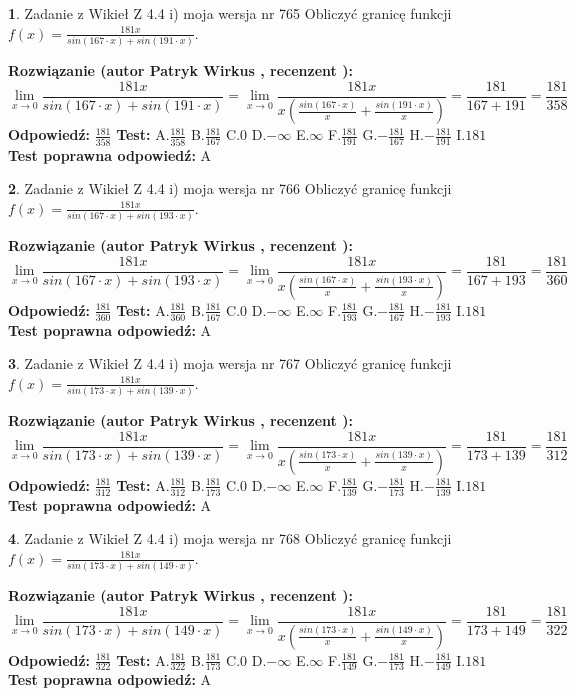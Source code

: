 \documentclass[12pt, a4paper]{article}
\theoremstyle{definition} %
\newtheorem{zad}{}
\newcommand{\zadStart}[1]{\begin{zad}#1\newline}
\newcommand{\zadStop}{\end{zad}}
\newcommand{\rozwStart}[2]{\noindent \textbf{Rozwiązanie (autor #1 , recenzent #2): }\newline}
\newcommand{\rozwStop}{\newline}
\newcommand{\odpStart}{\noindent \textbf{Odpowiedź:}\newline}
\newcommand{\odpStop}{\newline}
\newcommand{\testStart}{\noindent \textbf{Test:}\newline}
\newcommand{\testStop}{\newline}
\newcommand{\kluczStart}{\noindent \textbf{Test poprawna odpowiedź:}\newline}
\newcommand{\kluczStop}{\newline}
\begin{document}
\zadStart{Zadanie z Wikieł Z 4.4 i) moja wersja nr 765}
Obliczyć granicę funkcji $f(x)=\frac{181x}{sin(167\cdot x) +sin(191\cdot x)}$.
\zadStop
\rozwStart{Patryk Wirkus}{}
$$\lim\limits_{x\to 0}\frac{181x}{sin(167\cdot x) +sin(191\cdot x)}=\lim\limits_{x\to 0}\frac{181x}{x(\frac{sin(167\cdot x)}{x}+\frac{sin(191\cdot x)}{x})}=\frac{181}{167+191} = \frac{181}{358}$$
\rozwStop
\odpStart
$\frac{181}{358}$
\odpStop
\testStart
A.$\frac{181}{358}$
B.$\frac{181}{167}$
C.$0$
D.$-\infty$
E.$\infty$
F.$\frac{181}{191}$
G.$-\frac{181}{167}$
H.$-\frac{181}{191}$
I.$181$
\testStop
\kluczStart
A
\kluczStop



\zadStart{Zadanie z Wikieł Z 4.4 i) moja wersja nr 766}
Obliczyć granicę funkcji $f(x)=\frac{181x}{sin(167\cdot x) +sin(193\cdot x)}$.
\zadStop
\rozwStart{Patryk Wirkus}{}
$$\lim\limits_{x\to 0}\frac{181x}{sin(167\cdot x) +sin(193\cdot x)}=\lim\limits_{x\to 0}\frac{181x}{x(\frac{sin(167\cdot x)}{x}+\frac{sin(193\cdot x)}{x})}=\frac{181}{167+193} = \frac{181}{360}$$
\rozwStop
\odpStart
$\frac{181}{360}$
\odpStop
\testStart
A.$\frac{181}{360}$
B.$\frac{181}{167}$
C.$0$
D.$-\infty$
E.$\infty$
F.$\frac{181}{193}$
G.$-\frac{181}{167}$
H.$-\frac{181}{193}$
I.$181$
\testStop
\kluczStart
A
\kluczStop



\zadStart{Zadanie z Wikieł Z 4.4 i) moja wersja nr 767}
Obliczyć granicę funkcji $f(x)=\frac{181x}{sin(173\cdot x) +sin(139\cdot x)}$.
\zadStop
\rozwStart{Patryk Wirkus}{}
$$\lim\limits_{x\to 0}\frac{181x}{sin(173\cdot x) +sin(139\cdot x)}=\lim\limits_{x\to 0}\frac{181x}{x(\frac{sin(173\cdot x)}{x}+\frac{sin(139\cdot x)}{x})}=\frac{181}{173+139} = \frac{181}{312}$$
\rozwStop
\odpStart
$\frac{181}{312}$
\odpStop
\testStart
A.$\frac{181}{312}$
B.$\frac{181}{173}$
C.$0$
D.$-\infty$
E.$\infty$
F.$\frac{181}{139}$
G.$-\frac{181}{173}$
H.$-\frac{181}{139}$
I.$181$
\testStop
\kluczStart
A
\kluczStop



\zadStart{Zadanie z Wikieł Z 4.4 i) moja wersja nr 768}
Obliczyć granicę funkcji $f(x)=\frac{181x}{sin(173\cdot x) +sin(149\cdot x)}$.
\zadStop
\rozwStart{Patryk Wirkus}{}
$$\lim\limits_{x\to 0}\frac{181x}{sin(173\cdot x) +sin(149\cdot x)}=\lim\limits_{x\to 0}\frac{181x}{x(\frac{sin(173\cdot x)}{x}+\frac{sin(149\cdot x)}{x})}=\frac{181}{173+149} = \frac{181}{322}$$
\rozwStop
\odpStart
$\frac{181}{322}$
\odpStop
\testStart
A.$\frac{181}{322}$
B.$\frac{181}{173}$
C.$0$
D.$-\infty$
E.$\infty$
F.$\frac{181}{149}$
G.$-\frac{181}{173}$
H.$-\frac{181}{149}$
I.$181$
\testStop
\kluczStart
A
\kluczStop
\end{document}
